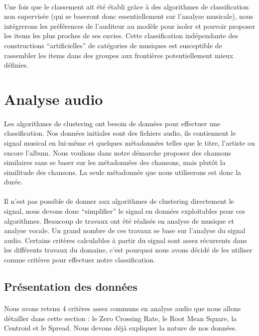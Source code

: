 \documentclass{ir}
\begin{document}
\paragraph{}
Une fois que le classement ait été établi grâce à des algorithmes de classification non supervisée (qui se 
baseront donc essentiellement sur l’analyse musicale), nous intégrerons les préférences de l’auditeur au 
modèle pour isoler et pouvoir proposer les items les plus proches de ses envies. Cette classification 
indépendante des constructions “artificielles” de catégories de musiques est susceptible de rassembler les 
items dans des groupes aux frontières potentiellement mieux définies.

\section{Analyse audio}
\paragraph{}
Les algorithmes de clustering ont besoin de données pour effectuer une classification. Nos données initiales 
sont des fichiers audio, ils contiennent le signal musical en lui-même et quelques métadonnées telles que le 
titre, l’artiste ou encore l'album. Nous voulions dans notre démarche proposer des chansons similaires sans 
se baser sur les métadonnées des chansons, mais plutôt la similitude des chansons. La seule métadonnée que 
nous utiliserons est donc la durée.

\paragraph{}
Il n’est pas possible de donner aux algorithmes de clustering directement le signal, nous devons donc 
“simplifier” le signal en données exploitables pour ces algorithmes. Beaucoup de travaux ont été réalisés 
en analyse de musique et analyse vocale. Un grand nombre de ces travaux se base sur l’analyse du signal 
audio. Certains critères calculables à partir du signal sont assez récurrents dans les différents travaux 
du domaine, c’est pourquoi nous avons décidé de les utiliser comme critères pour effectuer notre 
classification.

\subsection{Présentation des données}
\paragraph{}
Nous avons retenu 4 critères assez communs en analyse audio que nous allons détailler dans cette section : 
le Zero Crossing Rate, le Root Mean Square, la Centroid et le Spread. Nous devons déjà expliquer la nature 
de nos données.
\end{document}
